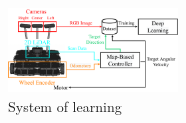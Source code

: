 \documentclass[10pt]{jarticle}
\begin{document}
    
   
    \begin{center}
        \begin{figure}[h]
            \centering
            \includegraphics[width=0.4\textwidth]{./fig/system_learning.pdf}
            \caption{System of learning}
            \label{fig:system_learning}
        \end{figure}
    \end{center}
    
\end{document}
